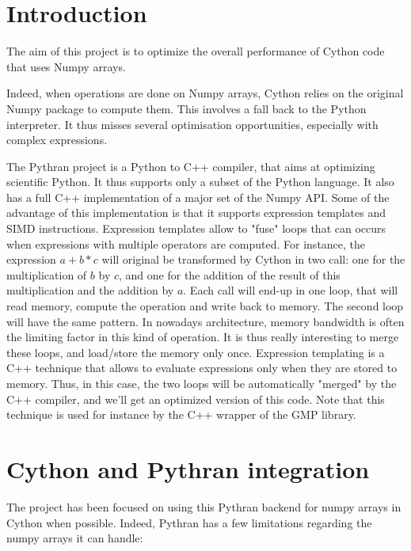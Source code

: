 \documentclass{deliverablereport}
\author{Adrien Guinet}
\begin{document}
\maketitle
%
\strut\githubissuedescription
\newpage\tableofcontents\newpage

\section{Introduction}

The aim of this project is to optimize the overall performance of Cython code
that uses Numpy arrays.

Indeed, when operations are done on Numpy arrays, Cython relies on the original
Numpy package to compute them. This involves a fall back to the Python
interpreter. It thus misses several optimisation opportunities, especially with
complex expressions.

The Pythran project is a Python to C++ compiler, that aims at optimizing
scientific Python. It thus supports only a subset of the Python language.
It also has a full C++ implementation of a major set of the Numpy API. Some of
the advantage of this implementation is that it supports expression templates
and SIMD instructions. Expression templates allow to "fuse" loops that can
occurs when expressions with multiple operators are computed. For instance,
the expression $a+b*c$ will original be transformed by Cython in two call: one
for the multiplication of $b$ by $c$, and one for the addition of the result of
this multiplication and the addition by $a$. Each call will end-up in one loop,
that will read memory, compute the operation and write back to memory. The
second loop will have the same pattern. In nowadays architecture, memory
bandwidth is often the limiting factor in this kind of operation. It is thus
really interesting to merge these loops, and load/store the memory only once.
Expression templating is a C++ technique that allows to evaluate expressions
only when they are stored to memory. Thus, in this case, the two loops will be
automatically "merged" by the C++ compiler, and we'll get an optimized version
of this code. Note that this technique is used for instance by the C++ wrapper
of the GMP library.

\section{Cython and Pythran integration}

The project has been focused on using this Pythran backend for numpy arrays in
Cython when possible. Indeed, Pythran has a few limitations regarding the numpy
arrays it can handle:
\end{document}
